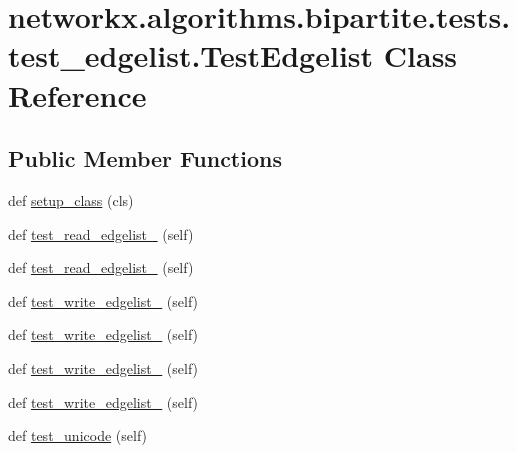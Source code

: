 \hypertarget{classnetworkx_1_1algorithms_1_1bipartite_1_1tests_1_1test__edgelist_1_1TestEdgelist}{}\section{networkx.\+algorithms.\+bipartite.\+tests.\+test\+\_\+edgelist.\+Test\+Edgelist Class Reference}
\label{classnetworkx_1_1algorithms_1_1bipartite_1_1tests_1_1test__edgelist_1_1TestEdgelist}
\subsection*{Public Member Functions}
\begin{DoxyCompactItemize}
\item 
def \hyperlink{classnetworkx_1_1algorithms_1_1bipartite_1_1tests_1_1test__edgelist_1_1TestEdgelist_a61cce92447727e205c332cfd7649fc60}{setup\+\_\+class} (cls)
\item 
def \hyperlink{classnetworkx_1_1algorithms_1_1bipartite_1_1tests_1_1test__edgelist_1_1TestEdgelist_a34bed2ac6da81eb0ae257b4660684b7f}{test\+\_\+read\+\_\+edgelist\+\_} (self)
\item 
def \hyperlink{classnetworkx_1_1algorithms_1_1bipartite_1_1tests_1_1test__edgelist_1_1TestEdgelist_aa8689e9b90a99e8cae462a09c5207fde}{test\+\_\+read\+\_\+edgelist\+\_} (self)
\item 
def \hyperlink{classnetworkx_1_1algorithms_1_1bipartite_1_1tests_1_1test__edgelist_1_1TestEdgelist_ad003292c6624b644b4b3a3f797a07c7e}{test\+\_\+write\+\_\+edgelist\+\_} (self)
\item 
def \hyperlink{classnetworkx_1_1algorithms_1_1bipartite_1_1tests_1_1test__edgelist_1_1TestEdgelist_ad39b21a4078c6181fad4bf762aeaf7b7}{test\+\_\+write\+\_\+edgelist\+\_} (self)
\item 
def \hyperlink{classnetworkx_1_1algorithms_1_1bipartite_1_1tests_1_1test__edgelist_1_1TestEdgelist_ac4a98f1beb44876ce1089874b4c8e81c}{test\+\_\+write\+\_\+edgelist\+\_} (self)
\item 
def \hyperlink{classnetworkx_1_1algorithms_1_1bipartite_1_1tests_1_1test__edgelist_1_1TestEdgelist_a21ff15b7dc0f9be35147ff351e7ee1c1}{test\+\_\+write\+\_\+edgelist\+\_} (self)
\item 
def \hyperlink{classnetworkx_1_1algorithms_1_1bipartite_1_1tests_1_1test__edgelist_1_1TestEdgelist_af58d5509a869a24b1a807718dc783069}{test\+\_\+unicode} (self)

\end{DoxyCompactItemize}
